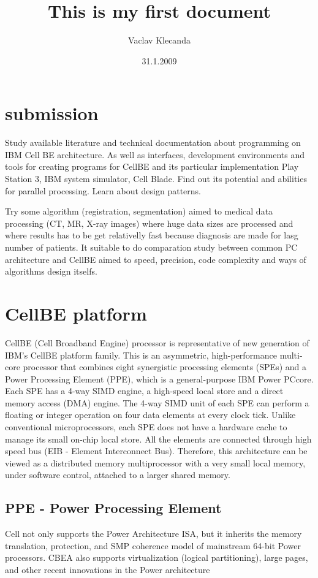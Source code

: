 \documentclass{article}
\title{This is my first document}
\author{Vaclav Klecanda}
\date{31.1.2009}
\begin{document}
\section*{submission}
Study available literature and technical documentation about programming on IBM Cell BE architecture. As well as interfaces, development environments and tools for creating programs for CellBE and its particular implementation Play Station 3, IBM system simulator, Cell Blade. Find out its potential and abilities for parallel processing. Learn about design patterns.

Try some algorithm (registration, segmentation) aimed to medical data processing (CT, MR, X-ray images) where huge data sizes are processed and where results has to be get relativelly fast because diagnosis are made for lasg number of patients. It suitable to do comparation study between common PC architecture and CellBE aimed to speed, precision, code complexity and ways of algorithms design itselfs.

\section{CellBE platform}

CellBE (Cell Broadband Engine) processor is representative of new generation of IBM's CellBE platform family. This is an asymmetric, high-performance multi-core processor that combines eight synergistic processing elements (SPEs) and a Power Processing Element (PPE), which is a general-purpose IBM Power PC\textregistered core. Each SPE has a 4-way SIMD engine, a high-speed local store and a direct memory access (DMA) engine. The 4-way SIMD unit of each SPE can perform a floating or integer operation on four data elements at every clock tick. Unlike conventional microprocessors, each SPE does not have a hardware cache to manage its small on-chip local store. All the elements are connected through high speed bus (EIB - Element Interconnect Bus). Therefore, this architecture can be viewed as a distributed memory multiprocessor with a very small local memory, under software control, attached to a larger shared memory.

\subsection{PPE - Power Processing Element}
Cell not only supports the Power Architecture ISA, but it inherits the memory translation, protection, and SMP coherence model of mainstream 64-bit Power processors. CBEA also supports virtualization (logical partitioning), large pages, and other recent innovations in the Power architecture
\end{document}
